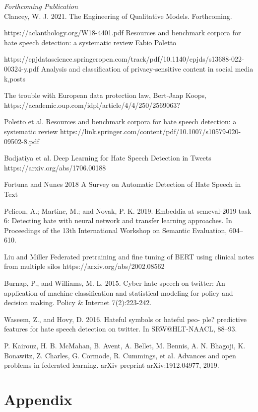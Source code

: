 \documentclass[letterpaper]{article} %
\begin{document}
\smallskip \noindent \textit{Forthcoming Publication}\\
Clancey, W. J. 2021. The Engineering of Qualitative Models. Forthcoming.

https://aclanthology.org/W18-4401.pdf Resources and benchmark corpora for hate speech detection: a systematic review Fabio Poletto

https://epjdatascience.springeropen.com/track/pdf/10.1140/epjds/s13688-022-00324-y.pdf Analysis and classification of privacy-sensitive content in social media k,posts

The trouble with European data protection law, Bert-Jaap Koops, https://academic.oup.com/idpl/article/4/4/250/2569063?

Poletto et al. Resources and benchmark corpora for hate speech
detection: a systematic review https://link.springer.com/content/pdf/10.1007/s10579-020-09502-8.pdf

Badjatiya et al. Deep Learning for Hate Speech Detection in Tweets https://arxiv.org/abs/1706.00188

Fortuna and Nunes 2018 A Survey on Automatic Detection of Hate Speech in Text

Pelicon, A.; Martinc, M.; and Novak, P. K. 2019. Embeddia at semeval-2019 task 6: Detecting hate with neural network and transfer learning approaches. In Proceedings of the 13th International Workshop on Semantic Evaluation, 604–610.

Liu and Miller Federated pretraining and fine tuning of BERT using clinical notes from multiple silos https://arxiv.org/abs/2002.08562

Burnap, P., and Williams, M. L. 2015. Cyber hate speech on twitter: An application of machine classification and statistical modeling for policy and decision making. Policy \& Internet 7(2):223-242.

Waseem, Z., and Hovy, D. 2016. Hateful symbols or hateful peo-
ple? predictive features for hate speech detection on twitter. In
SRW@HLT-NAACL, 88–93.

P. Kairouz, H. B. McMahan, B. Avent, A. Bellet, M. Bennis, A. N.
Bhagoji, K. Bonawitz, Z. Charles, G. Cormode, R. Cummings, et al.
Advances and open problems in federated learning. arXiv preprint
arXiv:1912.04977, 2019.

\section{Appendix}
\end{document}
